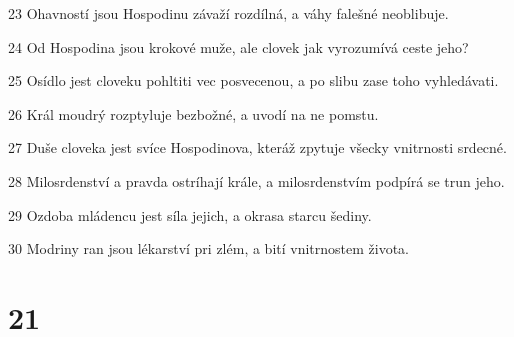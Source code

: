 \par 23 Ohavností jsou Hospodinu závaží rozdílná, a váhy falešné neoblibuje.
\par 24 Od Hospodina jsou krokové muže, ale clovek jak vyrozumívá ceste jeho?
\par 25 Osídlo jest cloveku pohltiti vec posvecenou, a po slibu zase toho vyhledávati.
\par 26 Král moudrý rozptyluje bezbožné, a uvodí na ne pomstu.
\par 27 Duše cloveka jest svíce Hospodinova, kteráž zpytuje všecky vnitrnosti srdecné.
\par 28 Milosrdenství a pravda ostríhají krále, a milosrdenstvím podpírá se trun jeho.
\par 29 Ozdoba mládencu jest síla jejich, a okrasa starcu šediny.
\par 30 Modriny ran jsou lékarství pri zlém, a bití vnitrnostem života.

\chapter{21}

